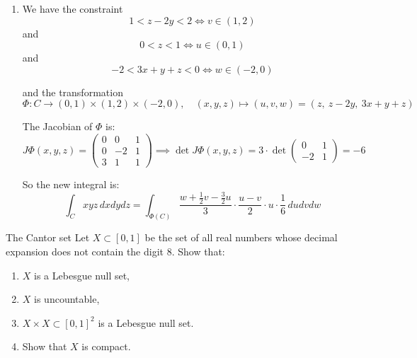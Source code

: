 \documentclass[12pt]{article}
\begin{document}
\begin{enumerate}
    The Jacobian of $\Phi$ is
    $$
        J \Phi^(x, y) = \begin{pmatrix}
            y & x \\
            2x & 0
        \end{pmatrix} \implies \det J \Phi(x, y) = -2x^2 = -2v
    $$

    So the new integral is
    $$
        \int_{B} y^2 e^{-xy} \, dx dy = \int_{\Phi(B)} \frac{u^2/v e^{-u}}{2v} \, du dv = \int_{\Phi(B)} \frac{u^2}{2v^2e^u} \, du dv
    $$

    \item We have the constraint
    $$
        1 < z - 2y < 2 \iff v \in (1, 2)
    $$
    and
    $$
        0 < z < 1 \iff u \in (0, 1)
    $$
    and
    $$
        -2 < 3x + y + z < 0 \iff w \in (-2, 0)
    $$

    and the transformation
    $$
        \Phi: C \rightarrow (0, 1) \times (1, 2) \times (-2, 0), \quad (x, y, z) \mapsto (u, v, w) = (z,\ z - 2y,\ 3x + y + z)
    $$

    The Jacobian of $\Phi$ is:
    $$
        J \Phi(x, y, z) = \begin{pmatrix}
            0 & 0 & 1 \\
            0 & -2 & 1 \\
            3 & 1 & 1
        \end{pmatrix} \implies \det J \Phi(x,y,z) = 3 \cdot \det \begin{pmatrix}
            0 & 1 \\
            -2 & 1
        \end{pmatrix} = -6
    $$

    So the new integral is:
    $$
        \int_{C} xyz \, dx dy dz = \int_{\Phi(C)} \frac{w + \frac{1}{2}v - \frac{3}{2}u}{3} \cdot \frac{u-v}{2} \cdot u \cdot \frac{1}{6} \, du dv dw
    $$
\end{enumerate}

\begin{problem}{The Cantor set}{}
Let $X \subset [0, 1]$ be the set of all real numbers whose decimal expansion does not contain the digit 8. Show that:

\begin{enumerate}
    \item $X$ is a Lebesgue null set,
    \item $X$ is uncountable,
    \item $X \times X \subset [0, 1]^2$ is a Lebesgue null set.
    \item Show that $X$ is compact.
\end{enumerate}
\end{problem}
\end{document}
